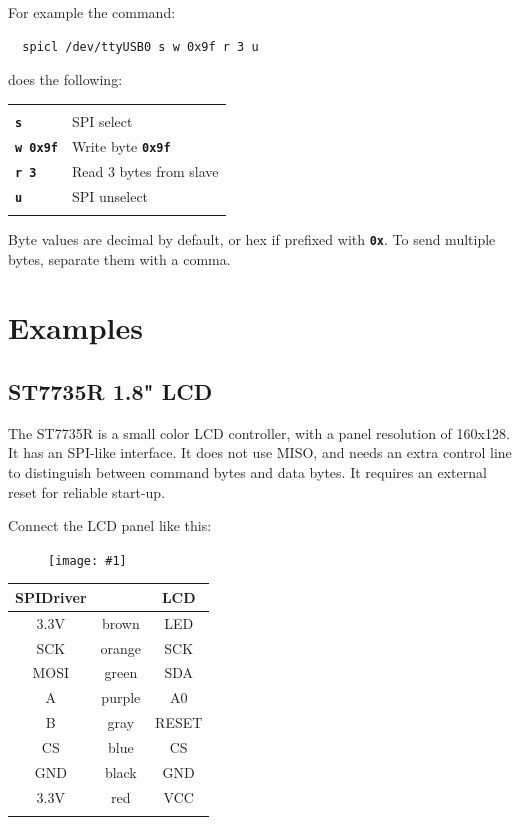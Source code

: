 \documentclass{article}
\newcommand{\pngw}[2]{
\begin{figure}[H]
\begin{center}
\texttt{[image: \#1]}
\end{center}
\end{figure}
}
\newcommand{\mach}[1]{\texttt{\textbf{#1}}}
\newcommand{\gap}{\vspace{10pt}}
\begin{document}
For example the command:

\begin{lstlisting}
  spicl /dev/ttyUSB0 s w 0x9f r 3 u
\end{lstlisting}

does the following:

\gap\begin{tabular}{ll}
\hline \\
 \mach{s}       & SPI select \\
 \mach{w 0x9f}  & Write byte \mach{0x9f} \\
 \mach{r 3}     & Read 3 bytes from slave \\
 \mach{u}       & SPI unselect \\
\hline \\
\end{tabular}

Byte values are decimal by default, or hex if prefixed with \mach{0x}.
To send multiple bytes, separate them with a comma.

\section{Examples}
\subsection{ST7735R 1.8" LCD}

The ST7735R is a small color LCD controller,
with a panel resolution of 160x128.
It has an SPI-like interface. It does not use MISO, and needs an
extra control line to distinguish between command bytes and data bytes.
It requires an external reset for reliable start-up.

Connect the LCD panel like this:

\pngw{img/spidriver/spidriver-lcd-1}{0.5}

\begin{center}
\gap\begin{tabular}{ccc}
\hline
SPIDriver&        & LCD     \\
\hline
3.3V     & brown  & LED     \\
SCK      & orange & SCK     \\
MOSI     & green  & SDA     \\
A        & purple & A0      \\
B        & gray   & RESET   \\
CS       & blue   & CS      \\
GND      & black  & GND     \\
3.3V     & red    & VCC     \\
\hline \\
\end{tabular}
\end{center}
\end{document}

